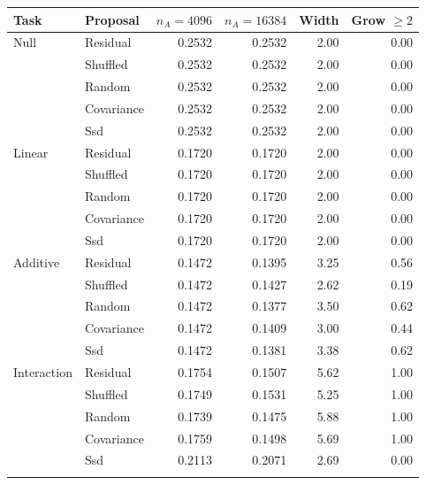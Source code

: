 \begin{tabular}{llrrrr}
\toprule
Task & Proposal & $n_A=4096$ & $n_A=16384$ & Width & Grow $\ge2$ \\
\midrule
Null & Residual & 0.2532 & 0.2532 & 2.00 & 0.00 \\
 & Shuffled & 0.2532 & 0.2532 & 2.00 & 0.00 \\
 & Random & 0.2532 & 0.2532 & 2.00 & 0.00 \\
 & Covariance & 0.2532 & 0.2532 & 2.00 & 0.00 \\
 & Ssd & 0.2532 & 0.2532 & 2.00 & 0.00 \\
\addlinespace
Linear & Residual & 0.1720 & 0.1720 & 2.00 & 0.00 \\
 & Shuffled & 0.1720 & 0.1720 & 2.00 & 0.00 \\
 & Random & 0.1720 & 0.1720 & 2.00 & 0.00 \\
 & Covariance & 0.1720 & 0.1720 & 2.00 & 0.00 \\
 & Ssd & 0.1720 & 0.1720 & 2.00 & 0.00 \\
\addlinespace
Additive & Residual & 0.1472 & 0.1395 & 3.25 & 0.56 \\
 & Shuffled & 0.1472 & 0.1427 & 2.62 & 0.19 \\
 & Random & 0.1472 & 0.1377 & 3.50 & 0.62 \\
 & Covariance & 0.1472 & 0.1409 & 3.00 & 0.44 \\
 & Ssd & 0.1472 & 0.1381 & 3.38 & 0.62 \\
\addlinespace
Interaction & Residual & 0.1754 & 0.1507 & 5.62 & 1.00 \\
 & Shuffled & 0.1749 & 0.1531 & 5.25 & 1.00 \\
 & Random & 0.1739 & 0.1475 & 5.88 & 1.00 \\
 & Covariance & 0.1759 & 0.1498 & 5.69 & 1.00 \\
 & Ssd & 0.2113 & 0.2071 & 2.69 & 0.00 \\
\addlinespace
\bottomrule
\end{tabular}